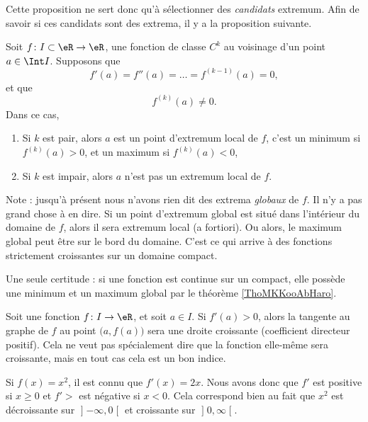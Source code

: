 Cette proposition ne sert donc qu'à sélectionner des \emph{candidats} extremum. Afin de savoir si ces candidats sont des extrema, il y a la proposition suivante.
\begin{proposition}
Soit $f\colon I\subset \eR\to \eR$, une fonction de classe $C^k$ au voisinage d'un point $a\in\Int I$. Supposons que
\begin{equation}
    f'(a)=f''(a)=\ldots=f^{(k-1)}(a)=0,
\end{equation}
et que
\begin{equation}
    f^{(k)}(a)\neq 0.
\end{equation}
Dans ce cas,
\begin{enumerate}

\item
Si $k$ est pair, alors $a$ est un point d'extremum local de $f$, c'est un minimum si $f^{(k)}(a)>0$, et un maximum si $f^{(k)}(a)<0$,
\item
Si $k$ est impair, alors $a$ n'est pas un extremum local de $f$.

\end{enumerate}
\end{proposition}

Note : jusqu'à présent nous n'avons rien dit des extrema \emph{globaux} de $f$. Il n'y a pas grand chose à en dire. Si un point d'extremum global est situé dans l'intérieur du domaine de $f$, alors il sera extremum local (a fortiori). Ou alors, le maximum global peut être sur le bord du domaine. C'est ce qui arrive à des fonctions strictement croissantes sur un domaine compact.

Une seule certitude : si une fonction est continue sur un compact, elle possède une minimum et un maximum global par le théorème \ref{ThoMKKooAbHaro}.

Soit une fonction $f\colon I\to \eR$, et soit $a\in I$. Si $f'(a)>0$, alors la tangente au graphe de $f$ au point $\big( a,f(a) \big)$ sera une droite croissante (coefficient directeur positif). Cela ne veut pas spécialement dire que la fonction elle-même sera croissante, mais en tout cas cela est un bon indice.

\begin{example}
	Si $f(x)=x^2$, il est connu que $f'(x)=2x$. Nous avons donc que $f'$ est positive si $x\geq 0$ et $f'>$ est négative si $x<0$. Cela correspond bien au fait que $x^2$ est décroissante sur $\mathopen] -\infty , 0 \mathclose[$ et croissante sur $\mathopen] 0 , \infty \mathclose[$.
\end{example}
 
